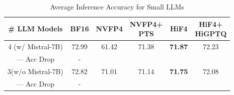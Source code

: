 \begin{table}[htbp]
\caption{Average Inference Accuracy for Small LLMs}
\label{tab3.2.3_average}
\centering
\begin{tabular}{c|c|cccc}
    
\hline
\hline

\rule{0pt}{2.2ex} \# LLM Models     & BF16  & NVFP4              & \makecell{NVFP4+\\PTS} & HiF4               & \makecell{HiF4+\\HiGPTQ} \\
\hline 

\rule{0pt}{2.2ex} 4 (w/ Mistral-7B) & 72.99 & 61.42              & 71.38                  & \textbf{71.87}     & 72.23 \\
\rule{0pt}{2.2ex} — Acc Drop        & -     & \color{red}{Crash} & \color{red}{-1.61}     & \color{red}{-1.12} & \color{red}{-0.76} \\
\hline

\rule{0pt}{2.2ex} 3(w/o Mistral-7B) & 72.82 & 71.01              & 71.14                  & \textbf{71.75}     & 72.08 \\
\rule{0pt}{2.2ex} — Acc Drop        & -     & \color{red}{-1.81} & \color{red}{-1.68}     & \color{red}{-1.07} & \color{red}{-0.74} \\
\hline

\hline
\end{tabular}
\end{table}

